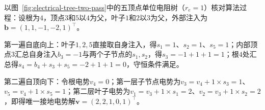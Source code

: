 以图~\ref{fig:electrical-tree-two-pass}中的五顶点单位电阻树（$r_e=1$）核对算法过程：设根为$4$，顶点$3$和$5$以$4$为父，叶子$1$和$2$以$3$为父，外部注入为$\bm b=(1,1,-1,-2,1)^\top$。

第一遍自底向上：叶子$1,2,5$直接取自身注入，得$s_1=1$、$s_2=1$、$s_5=1$；内部顶点$3$汇总自身注入$b_3=-1$与两个子节点的$s_1,s_2$，得$s_3 = -1 + 1 + 1 = 1$；根$4$处汇总得$s_4 = b_4 + s_3 + s_5 = -2 + 1 + 1 = 0$，守恒条件满足。

第二遍自顶向下：令根电势$v_4 = 0$；第一层子节点电势为$v_3 = v_4 + 1\times s_3 = 1$、$v_5 = v_4 + 1\times s_5 = 1$；第二层叶子电势为$v_1 = v_3 + 1\times s_1 = 2$、$v_2 = v_3 + 1\times s_2 = 2$，即得唯一接地电势解$\bm v=(2,2,1,0,1)^\top$。
